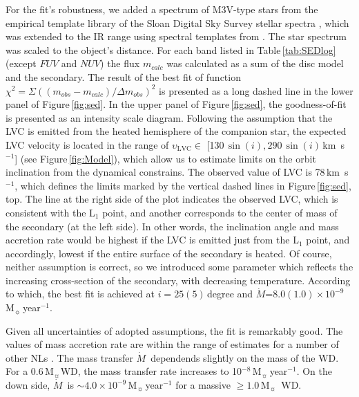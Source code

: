 \documentclass[fleqn,usenatbib]{mnras}
\def\msun{M$_{\odot}$}
\def\msun{M$_{\sun}$}
\def\mdot{$\dot M$}
\begin{document}
For the fit's robustness, we added a  spectrum of  M3V-type stars from the empirical template library of the Sloan Digital Sky Survey stellar
spectra \citep{Kesseli:2017aa}, which was extended to the IR range using  spectral templates from \citet{Rayner:2009aa}.
The star spectrum was scaled to the object's distance.  For each band listed in Table\,\ref{tab:SEDlog} (except $FUV$ and $NUV$) the flux $m_{calc}$ was calculated as a sum of the disc model and the secondary.
The result of the best fit of function $\chi^2 = \Sigma ((m_{obs} - m_{calc})/\Delta m_{obs})^2$ is presented as a long dashed line in the
lower panel of  Figure\,\ref{fig:sed}. 
In the upper panel of  Figure\,\ref{fig:sed}, the goodness-of-fit is presented as an intensity scale diagram. 
Following the assumption that the LVC is emitted from the heated hemisphere of the companion star, the expected LVC velocity is located in the
range of  $\upsilon_{\mathrm{LVC}} \in $  [130\,$\sin(i), 290\,\sin(i)$\,km~s$^{-1}$] (see Figure\,\ref{fig:Model}), which allow us to estimate
limits on the orbit inclination from the dynamical constrains.  The observed value of LVC is 78\,km~s$^{-1}$, which defines the limits marked by
the vertical dashed lines in  Figure\,\ref{fig:sed}, top. 
The line at the right side of the plot indicates the observed LVC, which is consistent with the L$_1$ point, and another corresponds to the center of
mass of the secondary (at the left side). In other words, the inclination angle and mass accretion rate would be highest if the LVC is
emitted just from the  L$_1$ point, and accordingly, lowest if the entire surface of the secondary is heated. Of course, neither
assumption is correct,
so we introduced some parameter which reflects the increasing cross-section of the secondary, with decreasing temperature. According to which, 
the best fit is achieved  at $i=25(5)$\,degree and \mdot=$8.0(1.0)\times10^{-9}$\,\msun\,year$^{-1}$. 


Given all uncertainties of adopted assumptions, the fit is remarkably good. The values of mass accretion rate are within the range of
estimates for a number of other NLs \citep[e.g. Figure 2 of ][]{2019arXiv191001852H}.  The mass transfer \mdot\  dependends slightly on
the mass of the WD. For a 0.6\,\msun WD,  the mass transfer rate  increases to  10$^{-8}$\,\msun\,year$^{-1}$. On the down side,   \mdot\  is
$\sim4.0\times10^{-9}$\,\msun\,year$^{-1}$  for a massive $\geq1.0$\,\msun\ WD.
\end{document}
